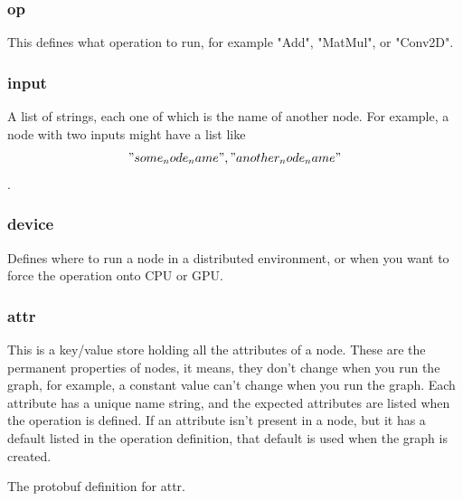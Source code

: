 \documentclass[11pt,openany]{book}
\begin{document}
\subsubsection{op}
This defines what operation to run, for example "Add", "MatMul", or "Conv2D".

\subsubsection{input}
A list of strings, each one of which is the name of another node. For example, a node with two inputs might have a list like \["some_node_name", "another_node_name"\].

\subsubsection{device}
Defines where to run a node in a distributed environment, or when you want to force the operation onto CPU or GPU.

\subsubsection{attr}
This is a key/value store holding all the attributes of a node. These are the permanent properties of nodes, it means, they don't change when you run the graph, for example, a constant value can't change when you run the graph.
Each attribute has a unique name string, and the expected attributes are listed when the operation is defined. If an attribute isn't present in a node, but it has a default listed in the operation definition, that default is used when the graph is created.

The protobuf definition for attr.
\end{document}
